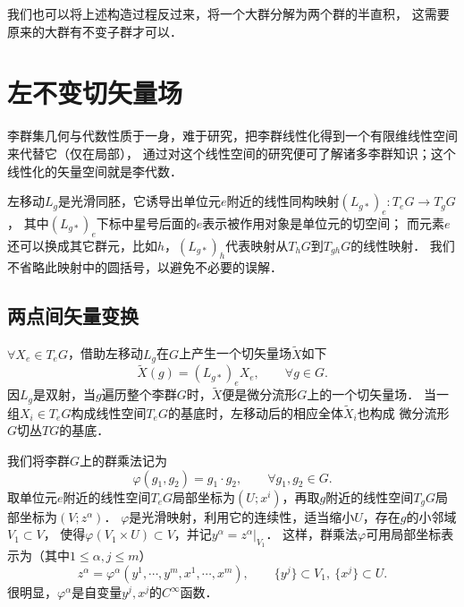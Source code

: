 我们也可以将上述构造过程反过来，将一个大群分解为两个群的半直积，
这需要原来的大群有不变子群才可以．








\section{左不变切矢量场}\label{chlg:sec_Left-Invariant-Vector-Fields}
李群集几何与代数性质于一身，难于研究，把李群线性化得到一个有限维线性空间来代替它（仅在局部），
通过对这个线性空间的研究便可了解诸多李群知识；这个线性化的矢量空间就是李代数．

左移动$L_{g}$是光滑同胚，它诱导出单位元$e$附近的线性同构映射$(L_{g*})_e:T_eG\to T_g G$，
其中$(L_{g*})_e$下标中星号后面的$e$表示被作用对象是单位元的切空间；
而元素$e$还可以换成其它群元，比如$h$，$(L_{g*})_h$代表映射从$T_hG$到$T_{gh} G$的线性映射．
我们不省略此映射中的圆括号，以避免不必要的误解．


\subsection{两点间矢量变换}
$\forall X_e \in T_e G$，借助左移动$L_g$在$G$上产生一个切矢量场$\widetilde{X}$如下
\begin{equation}
    \widetilde{X}(g) = (L_{g*})_e X_e , \qquad \forall g\in G.
\end{equation}
因$L_g$是双射，当$g$遍历整个李群$G$时，$\widetilde{X}$便是微分流形$G$上的一个切矢量场．
当一组$X_i\in T_eG$构成线性空间$T_eG$的基底时，左移动后的相应全体$\widetilde{X}_i$也构成
微分流形$G$切丛$TG$的基底．

我们将李群$G$上的群乘法记为
\begin{equation}
    \varphi(g_1,g_2)=g_1\cdot g_2 , \qquad \forall g_1 , g_2 \in G.
\end{equation}
取单位元$e$附近的线性空间$T_eG$局部坐标为$(U;x^i)$，再取$g$附近的线性空间$T_gG$局部坐标为$(V;z^\alpha)$．
$\varphi$是光滑映射，利用它的连续性，适当缩小$U$，存在$g$的小邻域$V_1\subset V$，
使得$\varphi(V_1\times U)\subset V$，并记$y^\alpha=z^\alpha|_{V_1}$．
这样，群乘法$\varphi$可用局部坐标表示为（其中$ 1\leqslant \alpha,j \leqslant m$）
\begin{equation}\label{chlg:eqn_z=xy}
    z^\alpha=\varphi^\alpha(y^1,\cdots,y^m, x^1,\cdots,x^m),\qquad
    \{y^j\}\subset V_1,\  \{x^j\}\subset U. 
\end{equation}
很明显，$\varphi^\alpha$是自变量$y^j,x^j$的$C^\infty$函数．

